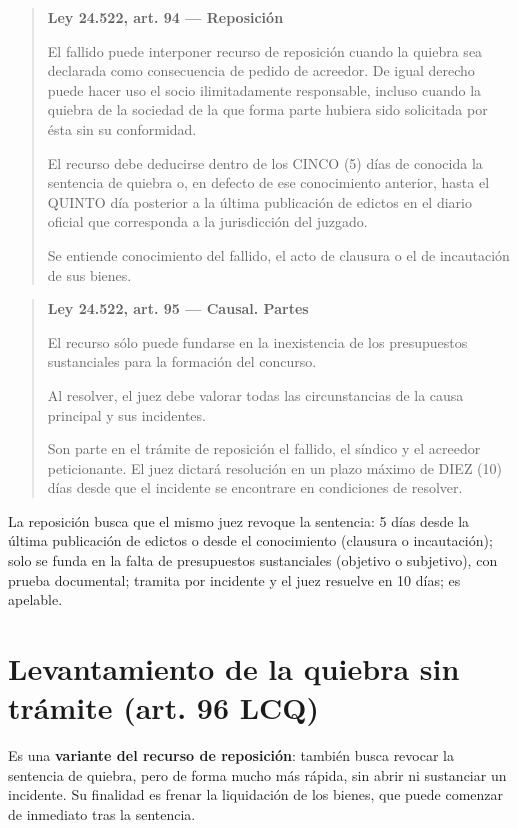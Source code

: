 \documentclass[12pt,oneside]{book}
\newenvironment{articulo}[1]
  {\begin{quote}\small\textbf{#1}\par\smallskip}
  {\end{quote}}
\begin{document}
\begin{articulo}{Ley 24.522, art. 94 --- Reposición}
El fallido puede interponer recurso de reposición cuando la quiebra sea declarada como consecuencia de pedido de acreedor. De igual derecho puede hacer uso el socio ilimitadamente responsable, incluso cuando la quiebra de la sociedad de la que forma parte hubiera sido solicitada por ésta sin su conformidad.

El recurso debe deducirse dentro de los CINCO (5) días de conocida la sentencia de quiebra o, en defecto de ese conocimiento anterior, hasta el QUINTO día posterior a la última publicación de edictos en el diario oficial que corresponda a la jurisdicción del juzgado.

Se entiende conocimiento del fallido, el acto de clausura o el de incautación de sus bienes.
\end{articulo}

\begin{articulo}{Ley 24.522, art. 95 --- Causal. Partes}
El recurso sólo puede fundarse en la inexistencia de los presupuestos sustanciales para la formación del concurso.

Al resolver, el juez debe valorar todas las circunstancias de la causa principal y sus incidentes.

Son parte en el trámite de reposición el fallido, el síndico y el acreedor peticionante. El juez dictará resolución en un plazo máximo de DIEZ (10) días desde que el incidente se encontrare en condiciones de resolver.
\end{articulo}

\begin{important}
La reposición busca que el mismo juez revoque la sentencia: 5 días desde la última publicación de edictos o desde el conocimiento (clausura o incautación); solo se funda en la falta de presupuestos sustanciales (objetivo o subjetivo), con prueba documental; tramita por incidente y el juez resuelve en 10 días; es apelable.
\end{important}

\section{Levantamiento de la quiebra sin trámite (art. 96 LCQ)}

Es una \textbf{variante del recurso de reposición}: también busca revocar la sentencia de quiebra, pero de forma mucho más rápida, sin abrir ni sustanciar un incidente. Su finalidad es frenar la liquidación de los bienes, que puede comenzar de inmediato tras la sentencia.
\end{document}
